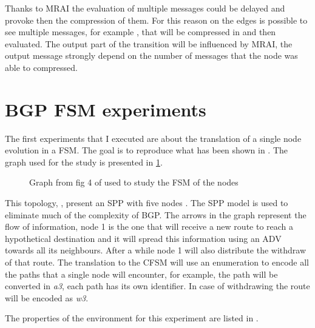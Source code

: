 Thanks to \ac{MRAI} the evaluation of multiple messages could be delayed and
provoke then the compression of them.
For this reason on the edges is possible to see multiple messages, for example
\q{[A1W1A1]}, that will be compressed in \q{[A1]} and then evaluated.
The output part of the transition will be influenced by \ac{MRAI}, the output
message strongly depend on the number of messages that the node was able
to compressed.


\section{BGP FSM experiments}
\label{sec:bgp_fsm_experiments}

The first experiments that I executed are about the translation of a single
node evolution in a \ac{FSM}.
The goal is to reproduce what has been shown in \cite{griffinFSM}.
The graph used for the study is presented in \cref{fig:griffin_fig_4}.

\begin{figure}[h]
    \begin{center}
        
    \end{center}
	\caption{Graph from fig 4 of \cite{griffinFSM} used to study the \ac{FSM}
		of the nodes}
    \label{fig:griffin_fig_4}
\end{figure}

This topology, , present an \ac{SPP} with five nodes \cite{griffin2002stable}.
The \ac{SPP} model is used to eliminate much of the complexity of \ac{BGP}.
The arrows in the graph represent the flow of information, node \num{1} is the one
that will receive a new route to reach a hypothetical destination and it will
spread this information using an \ac{ADV} towards all its neighbours.
After a while node \num{1} will also distribute the withdraw of that route.
The translation to the \ac{CFSM} will use an enumeration to encode all the
paths that a single node will encounter, for example, the path  will
be converted in \textit{a3}, each path has its own identifier.
In case of withdrawing the route will be encoded as \textit{w3}.

The properties of the environment for this experiment are listed in .

